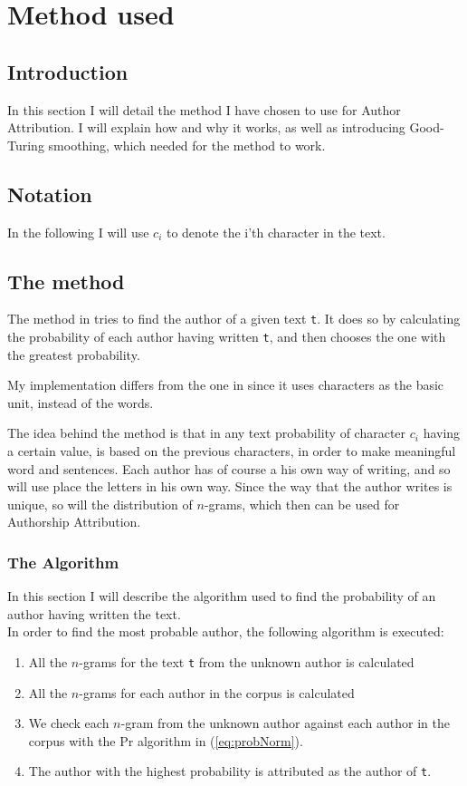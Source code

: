 \section{Method used}
\label{method}

\subsection{Introduction}
In this section I will detail the method I have chosen to use for Author Attribution. I will explain how and why it works, as well as introducing Good-Turing smoothing, which needed for the method to work.

\subsection*{Notation}
In the following I will use $c_i$ to denote the i'th character in the text.

\subsection{The method}
The method in \cite{nr4} tries to find the author of a given text \texttt{t}. It does so by calculating the probability of each author having written \texttt{t}, and then chooses the one with the greatest probability.

My implementation differs from the one in \cite{nr4} since it uses characters as the basic unit, instead of the words. 

The idea behind the method is that in any text probability of character $c_i$ having a certain value, is based on the previous characters, in order to make meaningful word and sentences. Each author has of course a his own way of writing, and so will use place the letters in his own way. Since the way that the author writes is unique, so will the distribution of $n$-grams, which then can be used for Authorship Attribution.

\subsubsection*{The Algorithm}
In this section I will describe the algorithm used to find the probability of an author having written the text.\\

In order to find the most probable author, the following algorithm is executed:

\begin{enumerate}
\item All the $n$-grams for the text \texttt{t} from the unknown author is calculated
\item All the $n$-grams for each author in the corpus is calculated
\item We check each $n$-gram from the unknown author against each author in the corpus with the Pr algorithm in (\ref{eq:probNorm}).  
\item The author with the highest probability is attributed as the author of \texttt{t}.
\end{enumerate}

